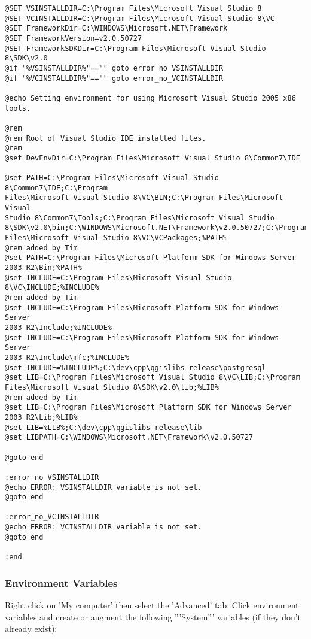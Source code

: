 \begin{verbatim}
@SET VSINSTALLDIR=C:\Program Files\Microsoft Visual Studio 8
@SET VCINSTALLDIR=C:\Program Files\Microsoft Visual Studio 8\VC
@SET FrameworkDir=C:\WINDOWS\Microsoft.NET\Framework
@SET FrameworkVersion=v2.0.50727
@SET FrameworkSDKDir=C:\Program Files\Microsoft Visual Studio 8\SDK\v2.0
@if "%VSINSTALLDIR%"=="" goto error_no_VSINSTALLDIR
@if "%VCINSTALLDIR%"=="" goto error_no_VCINSTALLDIR

@echo Setting environment for using Microsoft Visual Studio 2005 x86 tools.

@rem
@rem Root of Visual Studio IDE installed files.
@rem
@set DevEnvDir=C:\Program Files\Microsoft Visual Studio 8\Common7\IDE

@set PATH=C:\Program Files\Microsoft Visual Studio 8\Common7\IDE;C:\Program 
Files\Microsoft Visual Studio 8\VC\BIN;C:\Program Files\Microsoft Visual 
Studio 8\Common7\Tools;C:\Program Files\Microsoft Visual Studio 
8\SDK\v2.0\bin;C:\WINDOWS\Microsoft.NET\Framework\v2.0.50727;C:\Program 
Files\Microsoft Visual Studio 8\VC\VCPackages;%PATH%
@rem added by Tim
@set PATH=C:\Program Files\Microsoft Platform SDK for Windows Server 
2003 R2\Bin;%PATH%
@set INCLUDE=C:\Program Files\Microsoft Visual Studio 8\VC\INCLUDE;%INCLUDE%
@rem added by Tim
@set INCLUDE=C:\Program Files\Microsoft Platform SDK for Windows Server 
2003 R2\Include;%INCLUDE%
@set INCLUDE=C:\Program Files\Microsoft Platform SDK for Windows Server 
2003 R2\Include\mfc;%INCLUDE%
@set INCLUDE=%INCLUDE%;C:\dev\cpp\qgislibs-release\postgresql
@set LIB=C:\Program Files\Microsoft Visual Studio 8\VC\LIB;C:\Program 
Files\Microsoft Visual Studio 8\SDK\v2.0\lib;%LIB%
@rem added by Tim
@set LIB=C:\Program Files\Microsoft Platform SDK for Windows Server 
2003 R2\Lib;%LIB%
@set LIB=%LIB%;C:\dev\cpp\qgislibs-release\lib
@set LIBPATH=C:\WINDOWS\Microsoft.NET\Framework\v2.0.50727

@goto end

:error_no_VSINSTALLDIR
@echo ERROR: VSINSTALLDIR variable is not set. 
@goto end

:error_no_VCINSTALLDIR
@echo ERROR: VCINSTALLDIR variable is not set. 
@goto end

:end

\end{verbatim}

\hypertarget{toc97}{}
\subsubsection{Environment Variables}
Right click on 'My computer' then select the 'Advanced' tab. Click environment variables and 
create or augment the following '''System''' variables (if they don't already exist):


